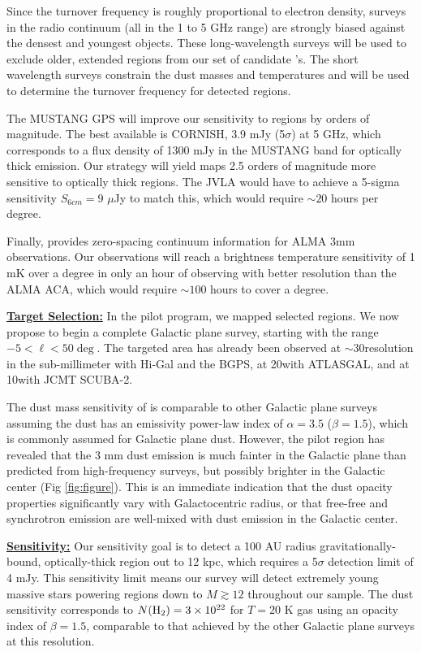 \documentclass[11pt,preprint]{aastex_nofoot}
\begin{document}
Since the turnover frequency is roughly proportional to electron density,
surveys in the radio continuum (all in the 1 to 5 GHz range) are strongly
biased against the densest and youngest objects.  These long-wavelength surveys
will be used to exclude older, extended \uchii regions from our set of
candidate \hchii's.  The short wavelength surveys constrain the dust masses and
temperatures and will be used to determine the turnover frequency for detected
\hchii regions.

The MUSTANG GPS will improve our sensitivity to \hchii regions by orders of
magnitude. The best available is CORNISH, 3.9 mJy (5$\sigma$) at 5 GHz, which
corresponds to a flux density of 1300 mJy in the MUSTANG band for optically
thick emission. Our strategy will yield maps 2.5 orders of magnitude more
sensitive to optically thick \hchii regions.  The JVLA would have to achieve a
5-sigma sensitivity $S_{6cm} = 9$ $\mu$Jy to match this, which would require
$\sim20$ hours per degree.




Finally, \MGPS provides zero-spacing continuum information for
ALMA 3mm observations.  Our observations will reach a brightness temperature
sensitivity of 1 mK over a degree in only an hour of observing with
better resolution than the ALMA ACA, which would require $\sim100$ hours to
cover a degree.

\indent\underline{\textbf{\helv Target Selection:}}
In the pilot program, we mapped selected regions.  We now propose to begin a complete
Galactic plane survey, starting with the range $-5 < \ell < 50\deg$.
The targeted area has already been observed at $\sim$30\arcsec resolution in
the sub-millimeter with Hi-Gal and the BGPS, at 20\arcsec with ATLASGAL, and at
10\arcsec with JCMT SCUBA-2.  

The dust mass sensitivity of \MGPS is comparable to other Galactic plane surveys assuming the
dust has an emissivity power-law index of $\alpha=3.5$ ($\beta=1.5$), which is 
commonly assumed for Galactic plane
dust.   However, the pilot region has revealed that the 3 mm dust emission is much fainter
in the Galactic plane than predicted from high-frequency surveys,
but possibly brighter in the Galactic center (Fig \ref{fig:figure}).  This is an immediate
indication that the dust opacity properties significantly vary with Galactocentric
radius, or that free-free and synchrotron emission are well-mixed with dust emission
in the Galactic center.

\indent\underline{\textbf{\helv Sensitivity:}}  Our sensitivity goal is to
detect a 100 AU radius gravitationally-bound, optically-thick \hii region out to 12 kpc, which requires a
5$\sigma$ detection limit of 4 mJy.  This sensitivity limit means our survey
will detect extremely young massive stars powering \hii regions down
to $M \gtrsim 12$ \msun throughout our sample.  The dust sensitivity corresponds to
$N(\textrm{H}_{2})=3\times10^{22}$ \persc for $T=20$ K gas using an opacity index of
$\beta=1.5$, comparable to that achieved by the other Galactic plane surveys at
this resolution.
\end{document}
